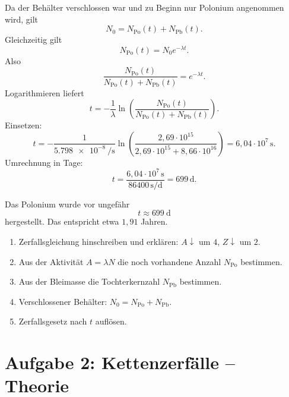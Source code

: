 \documentclass[11pt,a4paper]{scrartcl}
\newcommand{\paren}[1]{\left( #1 \right)}
\theoremstyle{definition}
\theoremstyle{plain}
\theoremstyle{remark}
\begin{document}
\begin{calculationbox}[title=Zeit seit Herstellung]
Da der Behälter verschlossen war und zu Beginn nur Polonium angenommen wird, gilt
\[
    N_0=N_{\mathrm{Po}}(t)+N_{\mathrm{Pb}}(t).
\]
Gleichzeitig gilt
\[
    N_{\mathrm{Po}}(t)=N_0 e^{-\lambda t}.
\]
Also
\[
    \frac{N_{\mathrm{Po}}(t)}{N_{\mathrm{Po}}(t)+N_{\mathrm{Pb}}(t)}=e^{-\lambda t}.
\]
Logarithmieren liefert
\[
    t=-\frac{1}{\lambda}\ln\paren{\frac{N_{\mathrm{Po}}(t)}{N_{\mathrm{Po}}(t)+N_{\mathrm{Pb}}(t)}}.
\]
Einsetzen:
\[
    t
    =-\frac{1}{\SI{5.798e-8}{\per\second}}
    \ln\paren{\frac{2,69\cdot 10^{15}}{2,69\cdot 10^{15}+8,66\cdot 10^{16}}}
    =6,04\cdot 10^7\,\mathrm{s}.
\]
Umrechnung in Tage:
\[
    t=\frac{6,04\cdot 10^7\,\mathrm{s}}{86400\,\mathrm{s/d}}=699\,\mathrm{d}.
\]
\end{calculationbox}

\begin{answerbox}
Das Polonium wurde vor ungefähr
\[
    \boxed{t\approx \SI{699}{\day}}
\]
hergestellt. Das entspricht etwa $1{,}91$ Jahren.
\end{answerbox}

\begin{talkbox}[title=Tafelvortrag zu Teil (b)]
\begin{enumerate}
    \item Zerfallsgleichung hinschreiben und erklären: $A\downarrow$ um $4$, $Z\downarrow$ um $2$.
    \item Aus der Aktivität $A=\lambda N$ die noch vorhandene Anzahl $N_{\mathrm{Po}}$ bestimmen.
    \item Aus der Bleimasse die Tochterkernzahl $N_{\mathrm{Pb}}$ bestimmen.
    \item Verschlossener Behälter: $N_0=N_{\mathrm{Po}}+N_{\mathrm{Pb}}$.
    \item Zerfallsgesetz nach $t$ auflösen.
\end{enumerate}
\end{talkbox}

\FloatBarrier
\newpage

\section{Aufgabe 2: Kettenzerfälle -- Theorie}
\end{document}
